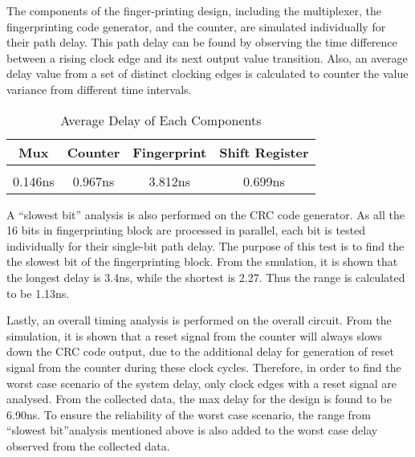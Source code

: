 \documentclass[10pt,journal,compsoc]{IEEEtran}
\begin{document}
    The components of the finger-printing design, including the multiplexer, the fingerprinting code generator, and the counter, are simulated individually for their path delay. This path delay can be found by observing the time difference between a rising clock edge and its next output value transition. Also, an average delay value from a set of distinct clocking edges is calculated to counter the value variance from different time intervals.
    
\begin{table}[ht] 
\caption{Average Delay of Each Components} %
\centering %
\begin{tabular}{c c c c } %
\hline\hline %
Mux & Counter & Fingerprint & Shift Register\\ [0.5ex] %
\hline %
\\ [0.2 ex]
0.146ns & 0.967ns & 3.812ns & 0.699ns \\ [1ex] %
\hline %
\end{tabular} 
\label{table:nonlin} %
\end{table} 

    A “slowest bit” analysis is also performed on the CRC code generator. As all the 16 bits in fingerprinting block are processed in parallel, each bit is tested individually for their single-bit path delay. The purpose of this test is to find the the slowest bit of the fingerprinting block. From the smulation, it is shown that the longest delay is 3.4ns, while the shortest is 2.27. Thus the range is calculated to be 1.13ns.
    
    Lastly, an overall timing analysis is performed on the overall circuit. From the simulation, it is shown that a reset signal from the counter will always slows down the CRC code output, due to the additional delay for  generation of reset signal from the counter during these clock cycles. Therefore, in order to find the worst case scenario of the system delay, only clock edges with a reset signal are analysed. From the collected data, the max delay for the design is found to be 6.90ns. To ensure the reliability of the worst case scenario, the range from “slowest bit”analysis mentioned above is also added to the worst case delay observed from the collected data.
    
\end{document}
